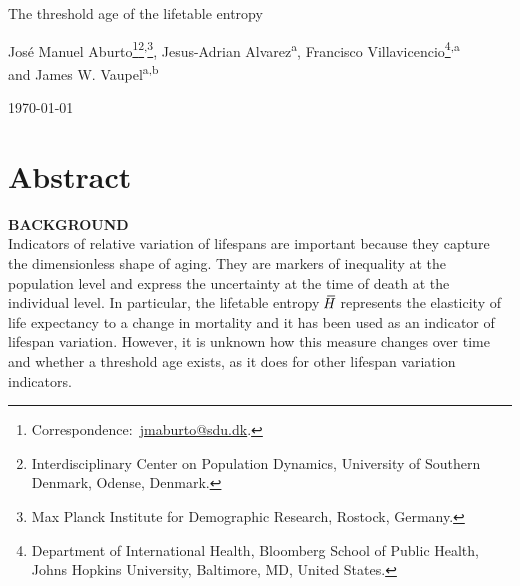 \documentclass[a4paper,twoside, openright, 12pt, leqno]{article}
\newcommand*\xbar[1]{%
   \hbox{%
     \vbox{%
       \hrule height 0.5pt %
       \kern0.3ex%
       \hbox{%
         \kern-0.28em%
         \ensuremath{#1}%
         \kern-0.05em%
       }%
     }%
   }%
}
\newcommand\fnsep{\textsuperscript{,}}
\begin{document}
\renewcommand{\thefootnote}{\alph{footnote}}

\thispagestyle{empty}

\begin{center}
    
    \vspace*{1cm}
    \LARGE{The threshold age of the lifetable entropy}	
    \vspace{.4cm}    
        
           
    \vspace{1cm}
    \large Jos\'e Manuel Aburto\footnote[*]{Correspondence:~\href{mailto:jmaburto@sdu.dk}{jmaburto@sdu.dk}.}\footnote{Interdisciplinary Center on Population Dynamics, University of Southern Denmark, Odense, Denmark.}\fnsep\footnote{Max Planck Institute for Demographic Research, Rostock, Germany.}, Jesus-Adrian Alvarez\textsuperscript{a}, Francisco Villavicencio\footnote{Department of International Health, Bloomberg School of Public Health, Johns Hopkins University, Baltimore, MD, United States.}\fnsep\textsuperscript{a}\\ and James W. Vaupel\textsuperscript{a}\fnsep\textsuperscript{b}
    
    \vspace{1cm}
    \large\today
    \vspace{1cm}
       
\end{center}

\renewcommand{\thefootnote}{\arabic{footnote}}
\setcounter{footnote}{0}


\section*{Abstract}
\bigskip

\textbf{BACKGROUND} \\
Indicators of relative variation of lifespans are important because they capture the dimensionless shape of aging. They are markers of inequality at the population level and express the uncertainty at the time of death at the individual level. In particular, the lifetable entropy $\,\xbar{H}$ represents the elasticity of life expectancy to a change in mortality and it has been used as an indicator of lifespan variation. However, it is unknown how this measure changes over time and whether a threshold age exists, as it does for other lifespan variation indicators.
\bigskip
\end{document}
